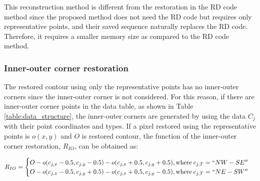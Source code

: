 This reconstruction method is different from the restoration in the RD code method since the proposed method does not need the RD code but requires only representative points, and their saved sequence naturally replaces the RD code. Therefore, it requires a smaller memory size as compared to the RD code method.

\subsubsection{Inner-outer corner restoration}



The restored contour using only the representative points has no inner-outer corners since the inner-outer corner is not considered. For this reason, if there are inner-outer corner points in the data table, as shown in Table \ref{table:data_structure}, the inner-outer corners are generated by using the data $C_j$ with their point coordinates and types. If a pixel restored using the representative points is $o(x, y)$ and $O$ is restored contour, the function of the inner-outer corner restoration, $R_{IO}$, can be obtained as:

\begin{equation}
R_{IO} = \begin{cases}
O - o(c_{j,x} - 0.5, c_{j,y} - 0.5) - o(c_{j,x} + 0.5, c_{j,y} + 0.5), \text{where\:} c_{j,T} = ``NW-SE'' \\
O - o(c_{j,x} - 0.5, c_{j,y} + 0.5) - o(c_{j,x} + 0.5, c_{j,y} - 0.5), \text{where\:} c_{j,T} = ``NE-SW'' \\
\end{cases}
\label{eq:r_io}
\end{equation}
